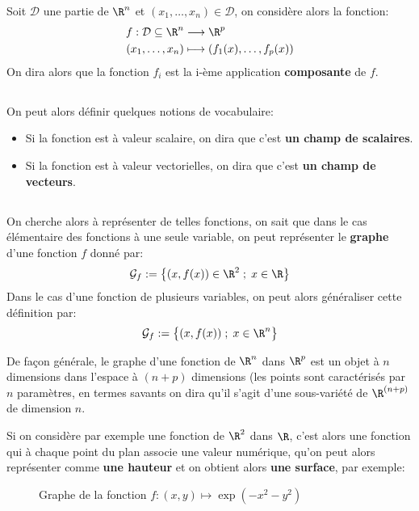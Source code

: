 Soit \(\mathcal{D}\) une partie de \(\R^n\) et \((x_1, \ldots, x_n) \in \mathcal{D}\), on considère alors la fonction:
\[
   \begin{aligned}
      f : \mathcal{D} \subseteq \R^n &\longrightarrow \R^p \\
      (x_1, \ldots, x_n) &\longmapsto (f_1(x), \ldots, f_p(x))
   \end{aligned}
\]
On dira alors que la fonction \(f_i\) est la i-ème application \textbf{composante} de \(f\).\+

\subsection*{}
On peut alors définir quelques notions de vocabulaire:
\begin{itemize}
   \item Si la fonction est à valeur scalaire, on dira que c'est \textbf{un champ de scalaires}.
   \item Si la fonction est à valeur vectorielles, on dira que c'est \textbf{un champ de vecteurs}.
\end{itemize}

\subsection*{}
On cherche alors à représenter de telles fonctions, on sait que dans le cas élémentaire des fonctions à une seule variable, on peut représenter le \textbf{graphe} d'une fonction \(f\) donné par:
\[
   \mathcal{G}_f := \bigl\{ (x, f(x)) \in \R^2 \; ; \; x \in \R \bigl\}   
\]
Dans le cas d'une fonction de plusieurs variables, on peut alors généraliser cette définition par:
\[
   \mathcal{G}_f := \bigl\{ (x, f(x)) \; ; \; x \in \R^n \bigl\}  
\]

De façon générale, le graphe d'une fonction de \(\R^n\) dans \(\R^p\) est un objet à \(n\) dimensions dans l'espace à \((n + p)\) dimensions (les points sont caractérisés par \(n\) paramètres, en termes
savants on dira qu'il s'agit d'une sous-variété de \(\R^{(n + p)}\) de dimension \(n\).\<

Si on considère par exemple une fonction de \(\R^2\) dans \(\R\), c'est alors une fonction qui à chaque point du plan associe une valeur numérique, qu'on peut alors représenter comme \textbf{une hauteur} et on obtient alors \textbf{une surface}, par exemple:

\begin{figure}
   \centering
   \vspace*{-0.5cm}
   \captionsetup{labelformat=empty}
   \caption{Graphe de la fonction \(f : (x, y) \mapsto \exp(-x^2 - y^2)\)}
\end{figure}
\pagebreak

